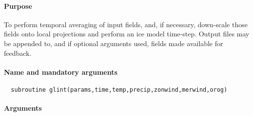 \paragraph{Purpose}
%
To perform temporal averaging of input fields, and, if necessary, down-scale
those fields onto local projections and perform an ice model time-step. Output
files may be appended to, and if optional arguments used, fields made
available for feedback.
%
\paragraph{Name and mandatory arguments}
%
\begin{verbatim}
  subroutine glint(params,time,temp,precip,zonwind,merwind,orog)
\end{verbatim}
%
\paragraph{Arguments}
%
